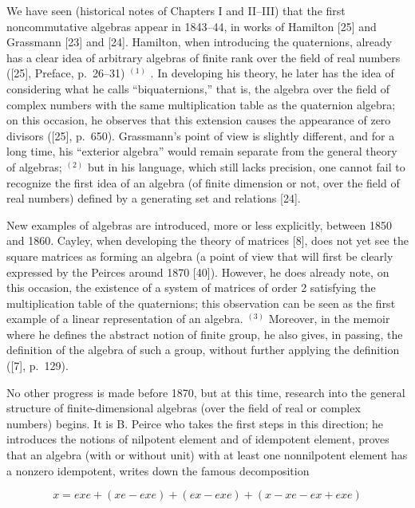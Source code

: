 
We have seen (historical notes of Chapters I and II--III) that the first noncommutative algebras appear in 1843--44, in works of Hamilton {[}25{]} and Grassmann {[}23{]} and {[}24{]}. Hamilton, when introducing the quaternions, already has a clear idea of arbitrary algebras of finite rank over the field of real numbers ({[}25{]}, Preface, p.~26--31) \(^{(1)}\) . In developing his theory, he later has the idea of considering what he calls ``biquaternions,'' that is, the algebra over the field of complex numbers with the same multiplication table as the quaternion algebra; on this occasion, he observes that this extension causes the appearance of zero divisors ({[}25{]}, p.~650). Grassmann's point of view is slightly different, and for a long time, his ``exterior algebra'' would remain separate from the general theory of algebras; \(^{(2)}\) but in his language, which still lacks precision, one cannot fail to recognize the first idea of an algebra (of finite dimension or not, over the field of real numbers) defined by a generating set and relations {[}24{]}.

New examples of algebras are introduced, more or less explicitly, between 1850 and 1860. Cayley, when developing the theory of matrices {[}8{]}, does not yet see the square matrices as forming an algebra (a point of view that will first be clearly expressed by the Peirces around 1870 {[}40{]}). However, he does already note, on this occasion, the existence of a system of matrices of order 2 satisfying the multiplication table of the quaternions; this observation can be seen as the first example of a linear representation of an algebra. \(^{(3)}\) Moreover, in the memoir where he defines the abstract notion of finite group, he also gives, in passing, the definition of the algebra of such a group, without further applying the definition ({[}7{]}, p.~129).

No other progress is made before 1870, but at this time, research into the general structure of finite-dimensional algebras (over the field of real or complex numbers) begins. It is B. Peirce who takes the first steps in this direction; he introduces the notions of nilpotent element and of idempotent element, proves that an algebra (with or without unit) with at least one nonnilpotent element has a nonzero idempotent, writes down the famous decomposition

\[
x = e x e + (x e - e x e) + (e x - e x e) + (x - x e - e x + e x e)
\]

